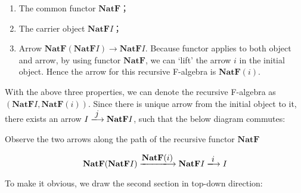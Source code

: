 \documentclass{article}
\begin{document}
\begin{enumerate}
\item The common functor $\mathbf{NatF}$；
\item The carrier object $\mathbf{NatF}I$；
\item Arrow $\mathbf{NatF}(\mathbf{NatF}I) \to \mathbf{NatF}I$. Because functor applies to both object and arrow, by using functor $\mathbf{NatF}$, we can `lift' the arrow $i$ in the initial object. Hence the arrow for this recursive F-algebra is $\mathbf{NatF}(i)$.
\end{enumerate}

With the above three properties, we can denote the recursive F-algebra as $(\mathbf{NatF}I, \mathbf{NatF}(i))$. Since there is unique arrow from the initial object to it, there exists an arrow $I \arrowto{j} \mathbf{NatF}I$, such that the below diagram commutes:

\begin{center}
\end{center}

Observe the two arrows along the path of the recursive functor $\mathbf{NatF}$

\[
  \mathbf{NatF}(\mathbf{NatF}I) \arrowto{\mathbf{NatF}(i)} \mathbf{NatF} I \arrowto{i} I
\]

To make it obvious, we draw the second section in top-down direction:

\begin{center}
\end{center}
\end{document}
